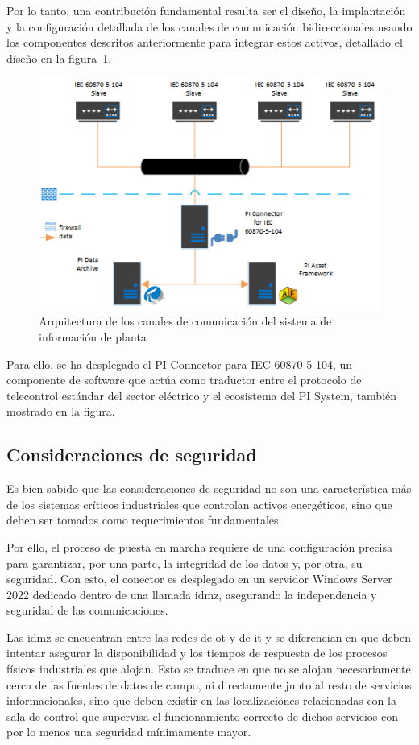 Por lo tanto, una contribución fundamental resulta ser el diseño, la implantación y la configuración detallada de los canales de comunicación bidireccionales usando los componentes descritos anteriormente para integrar estos activos, detallado el diseño en la figura~\ref{fig:sistema-de-informacion-de-planta}.

\begin{figure}
  \centering
  \includegraphics[width=0.5\linewidth]{figures/sistema-de-informacion-de-planta.png}
  \caption{Arquitectura de los canales de comunicación del sistema de información de planta~\cite{aveva2025aveva}}
  \label{fig:sistema-de-informacion-de-planta}
\end{figure}

Para ello, se ha desplegado el PI Connector para IEC 60870-5-104, un componente de software que actúa como traductor entre el protocolo de telecontrol estándar del sector eléctrico y el ecosistema del PI System, también mostrado en la figura.

\subsection{Consideraciones de seguridad}
\label{makereference3.4.2}

Es bien sabido que las consideraciones de seguridad no son una característica más de los sistemas críticos industriales que controlan activos energéticos, sino que deben ser tomados como requerimientos fundamentales.

Por ello, el proceso de puesta en marcha requiere de una configuración precisa para garantizar, por una parte, la integridad de los datos y, por otra, su seguridad. Con esto, el conector es desplegado en un servidor Windows Server 2022 dedicado dentro de una llamada \gls{idmz}, asegurando la independencia y seguridad de las comunicaciones.

Las \gls{idmz} se encuentran entre las redes de \gls{ot} y de \gls{it} y se diferencian en que deben intentar asegurar la disponibilidad y los tiempos de respuesta de los procesos físicos industriales que alojan. Esto se traduce en que no se alojan necesariamente cerca de las fuentes de datos de campo, ni directamente junto al resto de servicios informacionales, sino que deben existir en las localizaciones relacionadas con la sala de control que supervisa el funcionamiento correcto de dichos servicios con por lo menos una seguridad mínimamente mayor.

